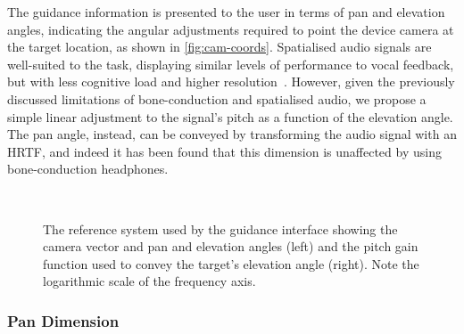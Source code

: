 \documentclass[]{interact}
\begin{document}
The guidance information is presented to the user in terms of pan and elevation angles, indicating the angular adjustments required to point the device camera at the target location, as shown in \cref{fig:cam-coords}.
Spatialised audio signals are well-suited to the task, displaying similar levels of performance to vocal feedback, but with less cognitive load and higher resolution~\citep{klatzky2006cognitive}.
However, given the previously discussed limitations of bone-conduction and spatialised audio, we propose a simple linear adjustment to the signal's pitch as a function of the elevation angle. 
The pan angle, instead, can be conveyed by transforming the audio signal with an HRTF, and indeed it has been found that this dimension is unaffected by using bone-conduction headphones\citep{schonstein2008comparison,macdonald2006spatial,stanley2006lateralization}. 

\begin{figure}[t]
  \centering
~
  \caption{The reference system used by the guidance interface showing the camera vector and pan and elevation angles (left) and the pitch gain function used to convey the target's elevation angle (right). Note the logarithmic scale of the frequency axis.}
\end{figure}

\subsubsection{Pan Dimension}
\end{document}
